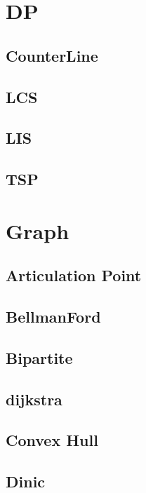 \section{DP}

\subsection{CounterLine}

\subsection{LCS}

\subsection{LIS}

\subsection{TSP}


\section{Graph}
\subsection{Articulation Point}

\subsection{BellmanFord}

\subsection{Bipartite}

\subsection{dijkstra}

\subsection{Convex Hull}

\subsection{Dinic}

